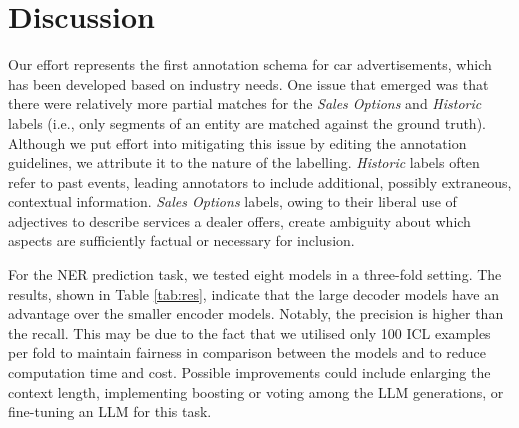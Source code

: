 \documentclass[11pt]{article}
\begin{document}
\section{Discussion}
\label{sec:discussion}
Our effort represents the first annotation schema for car advertisements, which has been developed based on industry needs. 
One issue that emerged was that there were relatively more partial matches for the \textit{Sales Options} and \textit{Historic} labels (i.e., only segments of an entity are matched against the ground truth). Although we put effort into mitigating this issue by editing the annotation guidelines, we attribute it to the nature of the labelling. \textit{Historic} labels often refer to past events, leading annotators to include additional, possibly extraneous, contextual information. \textit{Sales Options} labels, owing to their liberal use of adjectives to describe services a dealer offers, create ambiguity about which aspects are sufficiently factual or necessary for inclusion.


For the NER prediction task, we tested eight models in a three-fold setting. The results, shown in Table \ref{tab:res}, indicate that the large decoder models have an advantage over the smaller encoder models. Notably, the precision is higher than the recall. This may be due to the fact that we utilised only 100 ICL examples per fold to maintain fairness in comparison between the models and to reduce computation time and cost. Possible improvements could include enlarging the context length, implementing boosting or voting among the LLM generations, or fine-tuning an LLM for this task.



\end{document}

